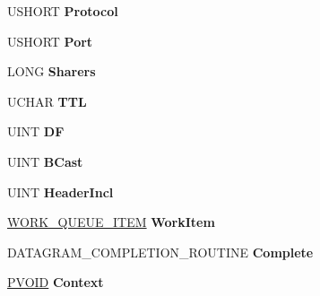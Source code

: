 \begin{DoxyCompactItemize}
U\+S\+H\+O\+RT {\bfseries Protocol}
\item 
\mbox{\label{struct___a_d_d_r_e_s_s___f_i_l_e_a4b63e25814325d208e9d307655aaedde}} 
U\+S\+H\+O\+RT {\bfseries Port}
\item 
\mbox{\label{struct___a_d_d_r_e_s_s___f_i_l_e_a9354897532b394791024b031273c3e0f}} 
L\+O\+NG {\bfseries Sharers}
\item 
\mbox{\label{struct___a_d_d_r_e_s_s___f_i_l_e_ab6ede061f605066113b8d8fc57188387}} 
U\+C\+H\+AR {\bfseries T\+TL}
\item 
\mbox{\label{struct___a_d_d_r_e_s_s___f_i_l_e_aba65b9b32ab497e1511d5356ee391758}} 
U\+I\+NT {\bfseries DF}
\item 
\mbox{\label{struct___a_d_d_r_e_s_s___f_i_l_e_af3a44e5bdebba4ad57c2cae3f6f42546}} 
U\+I\+NT {\bfseries B\+Cast}
\item 
\mbox{\label{struct___a_d_d_r_e_s_s___f_i_l_e_a00beb6b081d3086c99e8c10bb7989385}} 
U\+I\+NT {\bfseries Header\+Incl}
\item 
\mbox{\label{struct___a_d_d_r_e_s_s___f_i_l_e_ae7f2ceeb6ebedd121284131fbe6f5e33}} 
\hyperlink{struct___w_o_r_k___q_u_e_u_e___i_t_e_m}{W\+O\+R\+K\+\_\+\+Q\+U\+E\+U\+E\+\_\+\+I\+T\+EM} {\bfseries Work\+Item}
\item 
\mbox{\label{struct___a_d_d_r_e_s_s___f_i_l_e_a504e864a9072bede3aa322f426150b20}} 
D\+A\+T\+A\+G\+R\+A\+M\+\_\+\+C\+O\+M\+P\+L\+E\+T\+I\+O\+N\+\_\+\+R\+O\+U\+T\+I\+NE {\bfseries Complete}
\item 
\mbox{\label{struct___a_d_d_r_e_s_s___f_i_l_e_a6661c35da0281200753d81288d114aba}} 
\hyperlink{interfacevoid}{P\+V\+O\+ID} {\bfseries Context}
\item 
\mbox{\label{struct___a_d_d_r_e_s_s___f_i_l_e_aa8269696f50b33ea738a596cd9773456}} 

\end{DoxyCompactItemize}
